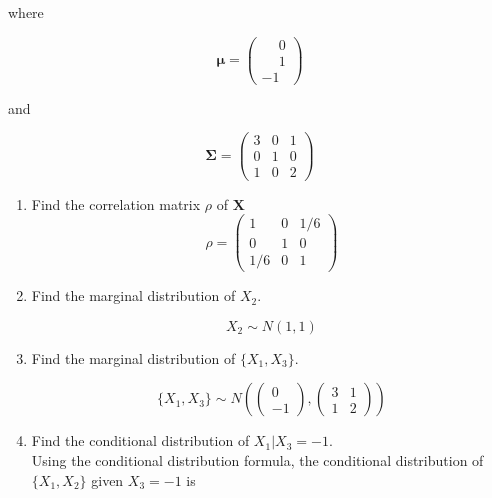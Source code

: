\documentclass[11pt]{article}
\theoremstyle{definition}
\begin{document}
where

$$\mathbf{\mu} = 
\begin{pmatrix}
\phantom{-}0\\
\phantom{-}1\\
-1
\end{pmatrix}
$$

and 

$$\mathbf{\Sigma} =  
\begin{pmatrix}
3 & 0 & 1\\
0 & 1 & 0\\
1 & 0 & 2
\end{pmatrix}
$$

\begin{enumerate}
\item Find the correlation matrix $\rho$ of $\mathbf{X}$
$$\rho = \begin{pmatrix}
1 & 0 & 1/6\\
0 & 1 & 0\\
1/6 & 0 & 1
\end{pmatrix}$$

\item Find the marginal distribution of $X_2$.

$$ X_2 \sim N(1, 1)$$
\item Find the marginal distribution of $\{X_1, X_3\}$.

$$\{X_1, X_3\} \sim N\left(\begin{pmatrix} 0 \\ -1 \end{pmatrix} , \begin{pmatrix} 3 & 1 \\ 1 & 2 \end{pmatrix}\right)$$
\item Find the conditional distribution of $X_1|X_3 = -1$.\\
Using the conditional distribution formula, the conditional distribution of $\{X_1, X_2\}$ given $X_3 = -1$ is


\end{enumerate}
\end{document}
